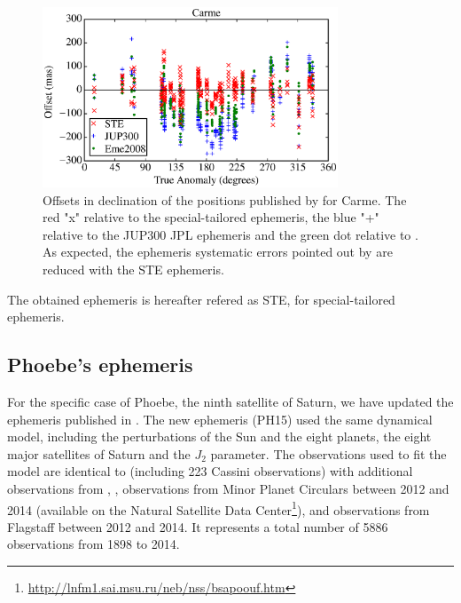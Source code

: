 \begin{figure}
\includegraphics[width=8.8cm]{figures/Carme_ephemeris.eps} 
\caption{Offsets in declination of the positions published by \cite{GomesJunior2015} for Carme. The red "x" relative to the special-tailored ephemeris, the blue "+" relative to the JUP300 JPL ephemeris and the green dot relative to \cite{Emelyanov2008}. As expected, the ephemeris systematic errors pointed out by \cite{GomesJunior2015} are reduced with the STE ephemeris.  \label{Fig:JPL-STE}}
\end{figure}


The obtained ephemeris is hereafter refered as STE, for special-tailored ephemeris.

\subsection{Phoebe's ephemeris}

For the specific case of Phoebe, the ninth satellite of Saturn, we have updated the ephemeris published in \cite{Desmars2013}. The new ephemeris (PH15) used the same dynamical model, including the perturbations of the Sun and the eight planets, the eight major satellites of Saturn and the $J_2$ parameter. The observations used to fit the model are identical to \cite{Desmars2013} (including 223 Cassini observations) with additional observations from \cite{GomesJunior2015}, \cite{Peng2015}, observations from Minor Planet Circulars between 2012 and 2014 (available on the Natural Satellite Data Center\footnote{\url{http://lnfm1.sai.msu.ru/neb/nss/bsapoouf.htm}}), and observations from Flagstaff \citep{NOFS} between 2012 and 2014. It represents a total number of 5886 observations from 1898 to 2014.

